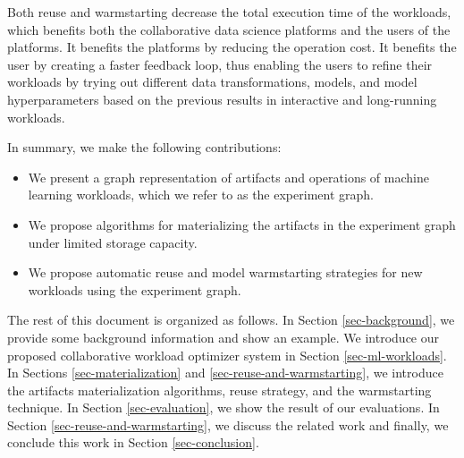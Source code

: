 Both reuse and warmstarting decrease the total execution time of the workloads, which benefits both the collaborative data science platforms and the users of the platforms.
It benefits the platforms by reducing the operation cost.
It benefits the user by creating a faster feedback loop, thus enabling the users to refine their workloads by trying out different data transformations, models, and model hyperparameters based on the previous results in interactive and long-running workloads.

In summary, we make the following contributions:
\begin{itemize}
\item We present a graph representation of artifacts and operations of machine learning workloads, which we refer to as the experiment graph.
\item We propose algorithms for materializing the artifacts in the experiment graph under limited storage capacity.
\item We propose automatic reuse and model warmstarting strategies for new workloads using the experiment graph.
\end{itemize}

The rest of this document is organized as follows.
In Section \ref{sec-background}, we provide some background information and show an example.
We introduce our proposed collaborative workload optimizer system in Section \ref{sec-ml-workloads}.
In Sections \ref{sec-materialization} and \ref{sec-reuse-and-warmstarting}, we introduce the artifacts materialization algorithms, reuse strategy, and the warmstarting technique. 
In Section \ref{sec-evaluation}, we show the result of our evaluations.
In Section \ref{sec-reuse-and-warmstarting}, we discuss the related work and finally, we conclude this work in Section \ref{sec-conclusion}.